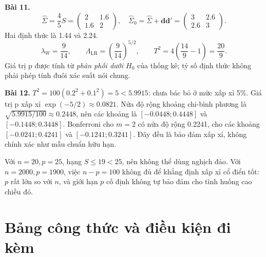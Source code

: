 \noindent\textbf{Bài 11.}
\[
 \widehat\Sigma=\frac45 S=
 \begin{pmatrix}2&1.6\\1.6&2\end{pmatrix},\quad
 \widehat\Sigma_0=\widehat\Sigma+\mathbf d\mathbf d'
 =\begin{pmatrix}3&2.6\\2.6&3\end{pmatrix}.
\]
Hai định thức là 1.44 và 2.24.
\[
 \lambda_W=\frac9{14},\qquad
 \Lambda_{\mathrm{LR}}=\left(\frac9{14}\right)^{5/2},\qquad
 T^2=4\left(\frac{14}9-1\right)=\frac{20}9.
\]
Giá trị p được tính từ \emph{phân phối dưới $H_0$} của thống kê;
tỷ số định thức không phải phép tính đuôi xác suất nói chung.

\noindent\textbf{Bài 12.}
$T^2=100(0.2^2+0.1^2)=5<5.9915$: chưa bác bỏ ở mức xấp xỉ 5\%.
Giá trị p xấp xỉ $\exp(-5/2)\approx0.0821$.
Nửa độ rộng khoảng chi-bình phương là
$\sqrt{5.9915/100}\approx0.2448$, nên các khoảng là
$[-0.0448;0.4448]$ và $[-0.1448;0.3448]$.
Bonferroni cho $m=2$ có nửa độ rộng 0.2241, cho các khoảng
$[-0.0241;0.4241]$ và $[-0.1241;0.3241]$.
Đây đều là bảo đảm xấp xỉ, không chính xác như mẫu chuẩn hữu hạn.

Với $n=20,p=25$, hạng $S\le19<25$, nên không thể dùng nghịch đảo.
Với $n=2000,p=1900$, việc $n-p=100$ không đủ để khẳng định xấp xỉ cổ
điển tốt: $p$ rất lớn so với $n$, và giới hạn $p$ cố định không tự bảo
đảm cho tình huống cao chiều đó.

\clearpage
\section{Bảng công thức và điều kiện đi kèm}
\label{sec:formula}
